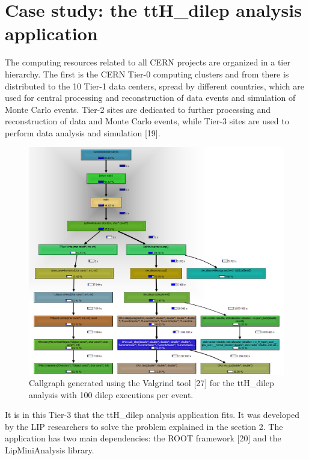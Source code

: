 
\chapter{Case study: the ttH\_dilep analysis application}

The computing resources related to all CERN projects are organized in a tier hierarchy. The first is the CERN Tier-0 computing clusters and from there is distributed to the 10 Tier-1 data centers, spread by different countries, which are used for central processing and reconstruction of data events and simulation of Monte Carlo events. Tier-2 sites are dedicated to further processing and reconstruction of data and Monte Carlo events, while Tier-3 sites are used to perform data analysis and simulation [19].

\begin{figure}[!htp]
	\begin{center}
		\includegraphics[scale=0.6]{../../common/img/callgraph_O3_100dilep.png}
		\caption{Callgraph generated using the Valgrind tool [27] for the ttH\_dilep analysis with 100 dilep executions per event.}
		\label{fig:callgraph}
	\end{center}
\end{figure}

It is in this Tier-3 that the ttH\_dilep analysis application fits. It was developed by the LIP researchers to solve the problem explained in the section 2. The application has two main dependencies: the ROOT framework [20] and the LipMiniAnalysis library.

